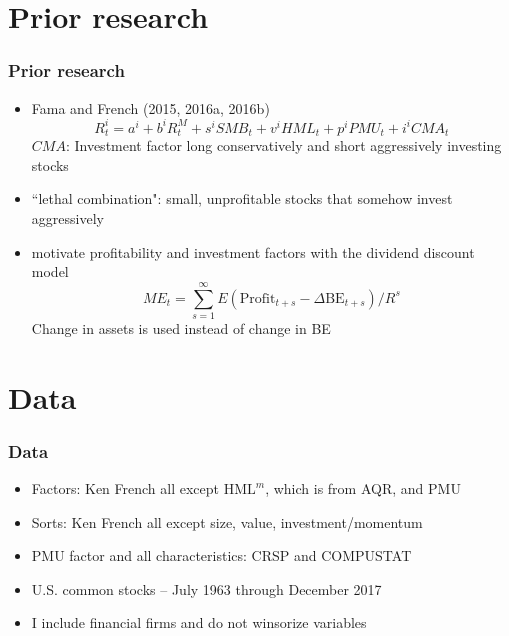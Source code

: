 \documentclass[notes]{beamer}  %
\begin{document}
\section{Prior research}

\begin{frame} \frametitle{Prior research}
  \begin{itemize}
    \item Fama and French (2015, 2016a, 2016b)
    \begin{equation} \label{eq:F16}
      R_t^i=a^i + b^iR_t^M + s^iSMB_t + v^iHML_t + p^iPMU_t + i^iCMA_t
    \end{equation}
    $CMA$: Investment factor long conservatively and short aggressively investing stocks
    \item ``lethal combination": small, unprofitable stocks that somehow invest aggressively
    \item \textcite{fama2006profitability} motivate profitability and investment factors with the dividend discount model
    \[ME_t =
    \sum_{s=1}^\infty E\left( \text{Profit}_{t+s}-
    \Delta\text{BE}_{t+s}\right) /R^s\]
    Change in assets is used instead of change in BE
  \end{itemize}
\end{frame}


\section{Data}

\begin{frame}
  \frametitle{Data}
  \begin{itemize}
    \item Factors: Ken French all except $\text{HML}^m$, which is from AQR, and PMU
    \item Sorts: Ken French all except size, value, investment/momentum
    \item PMU factor and all characteristics: CRSP and COMPUSTAT
    \item U.S. common stocks -- July 1963 through December 2017
    \item I include financial firms and do not winsorize variables
  \end{itemize}
\end{frame}
\end{document}
